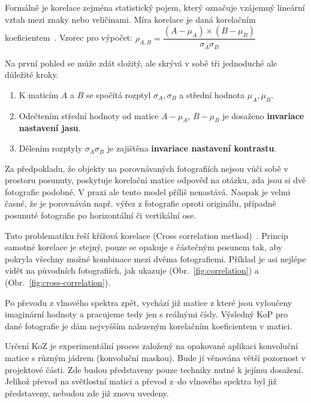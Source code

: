 Formálně je korelace zejména statistický pojem, který označuje vzájemný lineární vztah mezi znaky nebo veličinami. Míra korelace je daná korelačním koeficientem~\cite{correlation}. 
Vzorec pro výpočet: $ \rho_{A,B} = \dfrac{(A - \mu_{A}) × (B - \mu_{B})}{\sigma_{A}\sigma_{B}} $

Na první pohled se může zdát složitý, ale skrývá v sobě tři jednoduché ale důležité kroky.
\begin{enumerate}
	\setlength{\parskip}{0pt}
	\setlength{\itemsep}{0pt}
	\item{K maticím $ A $ a $ B $ se spočítá rozptyl $ \sigma_{A}, \sigma_{B} $ a střední hodnota $ \mu_{A}, \mu_{B} $.}
	\item{Odečtením střední hodnoty od matice $ A - \mu_{A} $, $ B - \mu_{B} $ je dosaženo \textbf{invariace nastavení jasu}.}
	\item{Dělením rozptyly $ \sigma_{A} \sigma_{B} $ je zajištěna \textbf{invariace nastavení kontrastu}.}
\end{enumerate}

Za předpokladu, že objekty na porovnávaných fotografiích nejsou vůči sobě v prostoru posunuty, poskytuje korelační matice odpověď na otázku, zda jsou si dvě fotografie podobné. V praxi ale tento model příliš nenastává. Naopak je velmi časné, že je porovnáván např. výřez z fotografie oproti originálu, případně posunuté fotografie po horizontální či vertikální ose.

Tuto problematiku řeší křížová korelace (Cross correlation method)~\cite{cross-correlation}. Princip samotné korelace je stejný, pouze se opakuje s částečným posunem tak, aby pokryla všechny možné kombinace mezi dvěma fotografiemi. Příklad je asi nejlépe vidět na původních fotografiích, jak ukazuje (Obr.~\ref{fig:correlation}) a (Obr.~\ref{fig:cross-correlation}).



Po převodu z vlnového spektra zpět, vychází již matice z které jsou vyloučeny imaginární hodnoty a pracujeme tedy jen s reálnými čísly. Výsledný KoP pro dané fotografie je dám nejvyšším nalezeným korelačním koeficientem v matici.

Určení KoZ je experimentální proces založený na opakované aplikaci konvoluční matice s různým jádrem (konvoluční maskou). Bude jí věnována větší pozornost v projektové části. Zde budou představeny pouze techniky nutné k jejímu dosažení. Jelikož převod na světlostní matici a převod z--do vlnového spektra byl již představeny, nebudou zde již znovu uvedeny.

